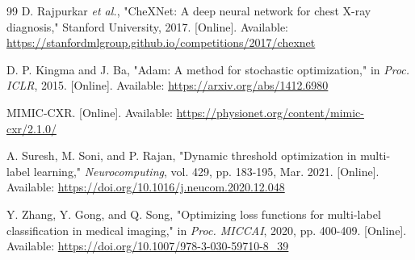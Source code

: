 \documentclass[12pt]{article}
\begin{document}
\begin{thebibliography}{99}
D. Rajpurkar \textit{et al.}, "CheXNet: A deep neural network for chest X-ray diagnosis," Stanford University, 2017. [Online]. Available: \url{https://stanfordmlgroup.github.io/competitions/2017/chexnet}

D. P. Kingma and J. Ba, "Adam: A method for stochastic optimization," in \textit{Proc. ICLR}, 2015. [Online]. Available: \url{https://arxiv.org/abs/1412.6980}

MIMIC-CXR. [Online]. Available: \url{https://physionet.org/content/mimic-cxr/2.1.0/}

A. Suresh, M. Soni, and P. Rajan, "Dynamic threshold optimization in multi-label learning," \textit{Neurocomputing}, vol. 429, pp. 183-195, Mar. 2021. [Online]. Available: \url{https://doi.org/10.1016/j.neucom.2020.12.048}

Y. Zhang, Y. Gong, and Q. Song, "Optimizing loss functions for multi-label classification in medical imaging," in \textit{Proc. MICCAI}, 2020, pp. 400-409. [Online]. Available: \url{https://doi.org/10.1007/978-3-030-59710-8_39}

\end{thebibliography}
\end{document}
